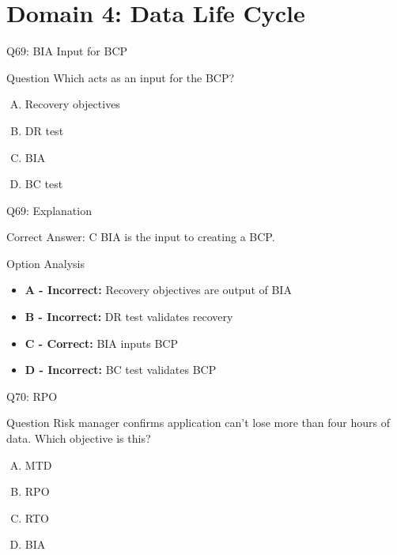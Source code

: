 \documentclass{beamer}
\begin{document}
	\section{Domain 4: Data Life Cycle}
	
	\begin{frame}{Q69: BIA Input for BCP}
		\begin{block}{Question}
			Which acts as an input for the BCP?
		\end{block}
		\begin{enumerate}[(A)]
			\item Recovery objectives
			\item DR test
			\item BIA
			\item BC test
		\end{enumerate}
	\end{frame}
	
	\begin{frame}{Q69: Explanation}
		\begin{block}{Correct Answer: C}
			BIA is the input to creating a BCP.
		\end{block}
		\begin{block}{Option Analysis}
			\begin{itemize}
				\item \textbf{A - Incorrect:} Recovery objectives are output of BIA
				\item \textbf{B - Incorrect:} DR test validates recovery
				\item \textbf{C - Correct:} BIA inputs BCP
				\item \textbf{D - Incorrect:} BC test validates BCP
			\end{itemize}
		\end{block}
	\end{frame}
	
	\begin{frame}{Q70: RPO}
		\begin{block}{Question}
			Risk manager confirms application can't lose more than four hours of data. Which objective is this?
		\end{block}
		\begin{enumerate}[(A)]
			\item MTD
			\item RPO
			\item RTO
			\item BIA
		\end{enumerate}
	\end{frame}
	
\end{document}
